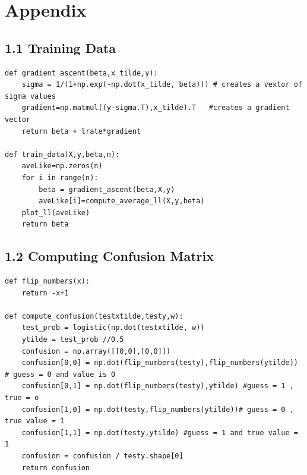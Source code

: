 \documentclass[twoside,twocolumn]{article}
\begin{document}
\section{Appendix}
\subsection{1.1 Training Data}
\begin{lstlisting}
def gradient_ascent(beta,x_tilde,y):
    sigma = 1/(1+np.exp(-np.dot(x_tilde, beta))) # creates a vextor of sigma values
    gradient=np.matmul((y-sigma.T),x_tilde).T   #creates a gradient vector
    return beta + lrate*gradient

def train_data(X,y,beta,n):
    aveLike=np.zeros(n)
    for i in range(n):
        beta = gradient_ascent(beta,X,y)
        aveLike[i]=compute_average_ll(X,y,beta)
    plot_ll(aveLike)
    return beta
\end{lstlisting}
\subsection{1.2 Computing Confusion Matrix}   
\begin{lstlisting}
def flip_numbers(x):
    return -x+1

def compute_confusion(testxtilde,testy,w):
    test_prob = logistic(np.dot(testxtilde, w))
    ytilde = test_prob //0.5
    confusion = np.array([[0,0],[0,0]])
    confusion[0,0] = np.dot(flip_numbers(testy),flip_numbers(ytilde)) # guess = 0 and value is 0
    confusion[0,1] = np.dot(flip_numbers(testy),ytilde) #guess = 1 , true = o
    confusion[1,0] = np.dot(testy,flip_numbers(ytilde))# guess = 0 , true value = 1
    confusion[1,1] = np.dot(testy,ytilde) #guess = 1 and true value = 1
    confusion = confusion / testy.shape[0]
    return confusion 
\end{lstlisting}
\end{document}
